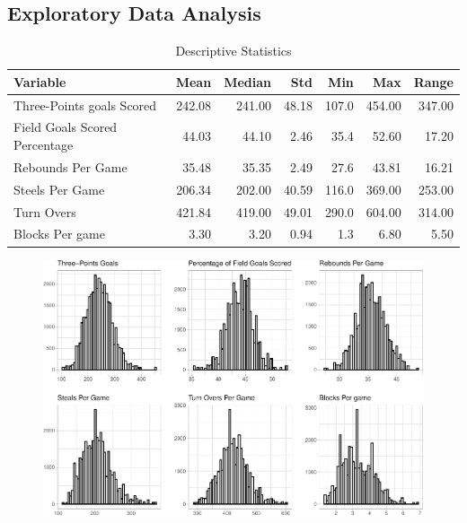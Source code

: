 \documentclass[
  english,
  man,floatsintext]{apa6}
\begin{document}
\hypertarget{exploratory-data-analysis}{%
\subsection{Exploratory Data Analysis}\label{exploratory-data-analysis}}

\begin{longtable}[t]{lrrrrrr}
\caption{\label{tab:unnamed-chunk-1}Descriptive Statistics}\\
\toprule
Variable & Mean & Median & Std & Min & Max & Range\\
\midrule
Three-Points goals Scored & 242.08 & 241.00 & 48.18 & 107.0 & 454.00 & 347.00\\
Field Goals Scored Percentage & 44.03 & 44.10 & 2.46 & 35.4 & 52.60 & 17.20\\
Rebounds Per Game & 35.48 & 35.35 & 2.49 & 27.6 & 43.81 & 16.21\\
Steels Per Game & 206.34 & 202.00 & 40.59 & 116.0 & 369.00 & 253.00\\
Turn Overs & 421.84 & 419.00 & 49.01 & 290.0 & 604.00 & 314.00\\
\addlinespace
Blocks Per game & 3.30 & 3.20 & 0.94 & 1.3 & 6.80 & 5.50\\
\bottomrule
\end{longtable}

\begin{figure}

{\centering \includegraphics{paper_files/figure-latex/unnamed-chunk-2-1} 

}

\caption{ }\label{fig:unnamed-chunk-2}
\end{figure}
\end{document}
